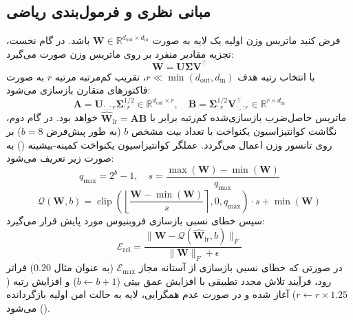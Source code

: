 \subsection{مبانی نظری و فرمول‌بندی ریاضی}
فرض کنید ماتریس وزن اولیه یک لایه به صورت $\mathbf{W} \in \mathbb{R}^{d_{\text{out}} \times d_{\text{in}}}$ باشد. در گام نخست، تجزیه مقادیر منفرد بر روی ماتریس وزن صورت می‌گیرد:
\begin{equation}
\mathbf{W} = \mathbf{U} \mathbf{\Sigma} \mathbf{V}^\top
\end{equation}
با انتخاب رتبه هدف $r \ll \min(d_{\text{out}}, d_{\text{in}})$، تقریب کم‌مرتبه مرتبه $r$ به صورت فاکتورهای متقارن بازسازی می‌شود:
\begin{equation}
\mathbf{A} = \mathbf{U}_{:, :r} \mathbf{\Sigma}_{:r}^{1/2} \in \mathbb{R}^{d_{\text{out}} \times r}, \quad \mathbf{B} = \mathbf{\Sigma}_{:r}^{1/2} \mathbf{V}_{:, :r}^\top \in \mathbb{R}^{r \times d_{\text{in}}}
\end{equation}
ماتریس حاصل‌ضرب بازسازی‌شده کم‌رتبه برابر با $\hat{\mathbf{W}}_{\text{lr}} = \mathbf{A} \mathbf{B}$ خواهد بود. در گام دوم، نگاشت کوانتیزاسیون یکنواخت با تعداد بیت مشخص $b$ (به طور پیش‌فرض $b=8$) بر روی تانسور وزن اعمال می‌گردد. عملگر کوانتیزاسیون یکنواخت کمینه-بیشینه () به صورت زیر تعریف می‌شود:
\begin{equation}
q_{\text{max}} = 2^b - 1, \quad s = \frac{\max(\mathbf{W}) - \min(\mathbf{W})}{q_{\text{max}}}
\end{equation}
\begin{equation}
\mathcal{Q}(\mathbf{W}, b) = \operatorname{clip}\left(\left\lfloor \frac{\mathbf{W} - \min(\mathbf{W})}{s} \right\rceil, 0, q_{\text{max}}\right) \cdot s + \min(\mathbf{W})
\end{equation}
سپس خطای نسبی بازسازی فروبنیوس مورد پایش قرار می‌گیرد:
\begin{equation}
\mathcal{E}_{\text{rel}} = \frac{\|\mathbf{W} - \mathcal{Q}(\hat{\mathbf{W}}_{\text{lr}}, b)\|_F}{\|\mathbf{W}\|_F + \epsilon}
\end{equation}
در صورتی که خطای نسبی بازسازی از آستانه مجاز $\mathcal{E}_{\text{max}}$ (به عنوان مثال $0.20$) فراتر رود، فرآیند تلاش مجدد تطبیقی با افزایش عمق بیتی ($b \leftarrow b+1$) و افزایش رتبه ($r \leftarrow r \times 1.25$) آغاز شده و در صورت عدم همگرایی، لایه به حالت امن اولیه بازگردانده می‌شود ().

